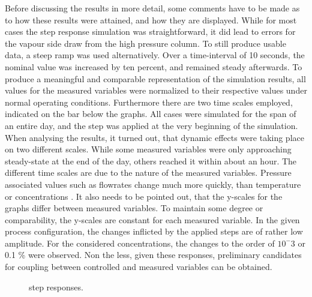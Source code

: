             Before discussing the results in more detail, some comments have to be made as to how these results
            were attained, and how they are displayed. While for most cases the step response simulation was
            straightforward, it did lead to errors for the vapour side draw from the high pressure column. To still
            produce usable data, a steep ramp was used alternatively. Over a time-interval of 10 seconds, the nominal
            value was increased  by ten percent, and remained steady afterwards. To produce a meaningful and comparable
            representation of the simulation results, all values for the measured variables were normalized to their
            respective values under normal operating conditions. Furthermore there are two time scales employed, indicated
            on the bar below the graphs. All cases were simulated for the span of an entire day, and the step was applied
            at the very beginning of the simulation. When analysing the results, it turned out, that dynamic effects were
            taking place on two different scales. While some measured variables were only approaching steady-state
            at the end of the day, others reached it within about an hour. The different time scales are due to the
            nature of the measured variables. Pressure associated values such as flowrates change much more quickly,
            than temperature or concentrations \cite{Roffel.2000}. It also needs to be pointed out, that the y-scales
            for the graphs differ between measured variables. To maintain some degree or comparability,
            the y-scales are constant for each measured variable. In the given process configuration, the changes
            inflicted by the applied steps are of rather low amplitude. For the considered concentrations, the changes
            to the order of $10^-{3}$ or 0.1 \% were observed. Non the less, given these responses, preliminary candidates
            for coupling between controlled and measured variables can be obtained.

            \begin{landscape}
                \begin{figure}
                    \center
                    
                    \caption{step responses.}
                    \label{fig:opt:stepresp}
                \end{figure}
            \end{landscape}



